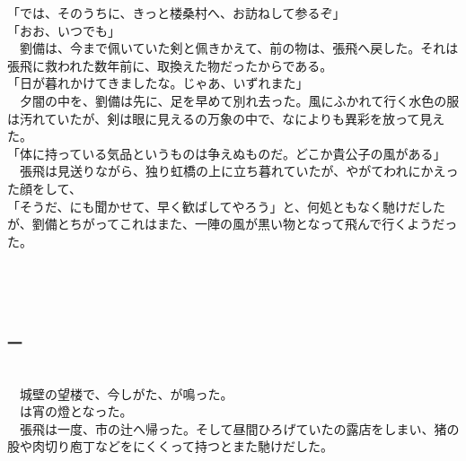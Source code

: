 \documentclass[
  paper=a5,
  fontsize=10pt,
  jafontsize=9.5pt,
  tate,                  %
  open_bracket_pos=nibu, %
]{jlreq}
\begin{document}
「では、そのうちに、きっと楼桑村へ、お訪ねして参るぞ」\\


「おお、いつでも」\\


　劉備は、今まで佩いていた剣と佩きかえて、前の物は、張飛へ戻した。それは張飛に救われた数年前に、取換えた物だったからである。\\


「日が暮れかけてきましたな。じゃあ、いずれまた」\\


　夕闇の中を、劉備は先に、足を早めて別れ去った。風にふかれて行く水色の服は汚れていたが、剣は眼に見えるの万象の中で、なによりも異彩を放って見えた。\\


「体に持っている気品というものは争えぬものだ。どこか貴公子の風がある」\\


　張飛は見送りながら、独り虹橋の上に立ち暮れていたが、やがてわれにかえった顔をして、\\


「そうだ、にも聞かせて、早く歓ばしてやろう」と、何処ともなく馳けだしたが、劉備とちがってこれはまた、一陣の風が黒い物となって飛んで行くようだった。\\

\\

\subsection{}

\\

\subsubsection{一}

\\


　城壁の望楼で、今しがた、が鳴った。\\


　は宵の燈となった。\\


　張飛は一度、市の辻へ帰った。そして昼間ひろげていたの露店をしまい、猪の股や肉切り庖丁などをにくくって持つとまた馳けだした。\\
\end{document}
